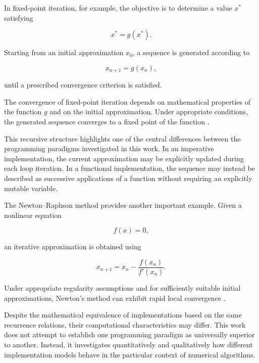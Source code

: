 In fixed-point iteration, for example, the objective is to determine a value
$x^\ast$ satisfying

\begin{equation}
    x^\ast = g(x^\ast).
\end{equation}

Starting from an initial approximation $x_0$, a sequence is generated according
to

\begin{equation}
    x_{n+1} = g(x_n),
\end{equation}

until a prescribed convergence criterion is satisfied.

The convergence of fixed-point iteration depends on mathematical properties of
the function $g$ and on the initial approximation. Under appropriate
conditions, the generated sequence converges to a fixed point of the function
\cite{burden2016numerical}.

This recursive structure highlights one of the central differences between the
programming paradigms investigated in this work. In an imperative
implementation, the current approximation may be explicitly updated during
each loop iteration. In a functional implementation, the sequence may instead
be described as successive applications of a function without requiring an
explicitly mutable variable.

The Newton--Raphson method provides another important example. Given a nonlinear
equation

\begin{equation}
    f(x)=0,
\end{equation}

an iterative approximation is obtained using

\begin{equation}
    x_{n+1}
    =
    x_n -
    \frac{f(x_n)}{f'(x_n)}.
\end{equation}

Under appropriate regularity assumptions and for sufficiently suitable initial
approximations, Newton's method can exhibit rapid local convergence
\cite{burden2016numerical,chapra2021numerical}.

Despite the mathematical equivalence of implementations based on the same
recurrence relations, their computational characteristics may differ. This
work does not attempt to establish one programming paradigm as universally
superior to another. Instead, it investigates quantitatively and qualitatively
how different implementation models behave in the particular context of
numerical algorithms.

